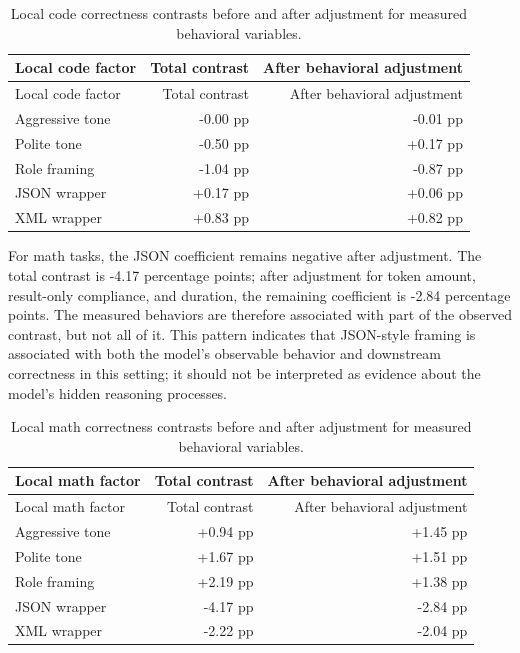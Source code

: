 \begin{longtable}[]{@{}lrr@{}}
\caption{Local code correctness contrasts before and after adjustment for measured behavioral variables.}\label{tab:local-code-mediation}\tabularnewline
\toprule\noalign{}
Local code factor & Total contrast & After behavioral adjustment \\
\midrule\noalign{}
\endfirsthead
\toprule\noalign{}
Local code factor & Total contrast & After behavioral adjustment \\
\midrule\noalign{}
\endhead
\bottomrule\noalign{}
\endlastfoot
Aggressive tone & -0.00 pp & -0.01 pp \\
Polite tone & -0.50 pp & +0.17 pp \\
Role framing & -1.04 pp & -0.87 pp \\
JSON wrapper & +0.17 pp & +0.06 pp \\
XML wrapper & +0.83 pp & +0.82 pp \\
\end{longtable}

For math tasks, the JSON coefficient remains negative after adjustment. The total contrast is -4.17 percentage points; after adjustment for token amount, result-only compliance, and duration, the remaining coefficient is -2.84 percentage points. The measured behaviors are therefore associated with part of the observed contrast, but not all of it. This pattern indicates that JSON-style framing is associated with both the model's observable behavior and downstream correctness in this setting; it should not be interpreted as evidence about the model's hidden reasoning processes.

\begin{longtable}[]{@{}lrr@{}}
\caption{Local math correctness contrasts before and after adjustment for measured behavioral variables.}\label{tab:local-math-mediation}\tabularnewline
\toprule\noalign{}
Local math factor & Total contrast & After behavioral adjustment \\
\midrule\noalign{}
\endfirsthead
\toprule\noalign{}
Local math factor & Total contrast & After behavioral adjustment \\
\midrule\noalign{}
\endhead
\bottomrule\noalign{}
\endlastfoot
Aggressive tone & +0.94 pp & +1.45 pp \\
Polite tone & +1.67 pp & +1.51 pp \\
Role framing & +2.19 pp & +1.38 pp \\
JSON wrapper & -4.17 pp & -2.84 pp \\
XML wrapper & -2.22 pp & -2.04 pp \\
\end{longtable}

